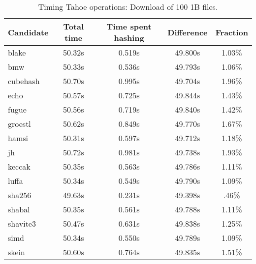 \begin{table}[h]
  \centering
  \begin{tabular}{ | l | c | c | c | c | }
    \hline
    Candidate & Total time & Time spent hashing & Difference & Fraction \\ \hline
    blake & 50.32s & 0.519s & 49.800s & 1.03\% \\ \hline
    bmw & 50.33s & 0.536s & 49.793s & 1.06\% \\ \hline
    cubehash & 50.70s & 0.995s & 49.704s & 1.96\% \\ \hline
    echo & 50.57s & 0.725s & 49.844s & 1.43\% \\ \hline
    fugue & 50.56s & 0.719s & 49.840s & 1.42\% \\ \hline
    groestl & 50.62s & 0.849s & 49.770s & 1.67\% \\ \hline
    hamsi & 50.31s & 0.597s & 49.712s & 1.18\% \\ \hline
    jh & 50.72s & 0.981s & 49.738s & 1.93\% \\ \hline
    keccak & 50.35s & 0.563s & 49.786s & 1.11\% \\ \hline
    luffa & 50.34s & 0.549s & 49.790s & 1.09\% \\ \hline
    sha256 & 49.63s & 0.231s & 49.398s & .46\% \\ \hline
    shabal & 50.35s & 0.561s & 49.788s & 1.11\% \\ \hline
    shavite3 & 50.47s & 0.631s & 49.838s & 1.25\% \\ \hline
    simd & 50.34s & 0.550s & 49.789s & 1.09\% \\ \hline
    skein & 50.60s & 0.764s & 49.835s & 1.51\% \\ \hline
  \end{tabular}
  \caption{Timing Tahoe operations: Download of 100 1B files.}
  \label{tbl:hashingtimes:get1b}
\end{table}

